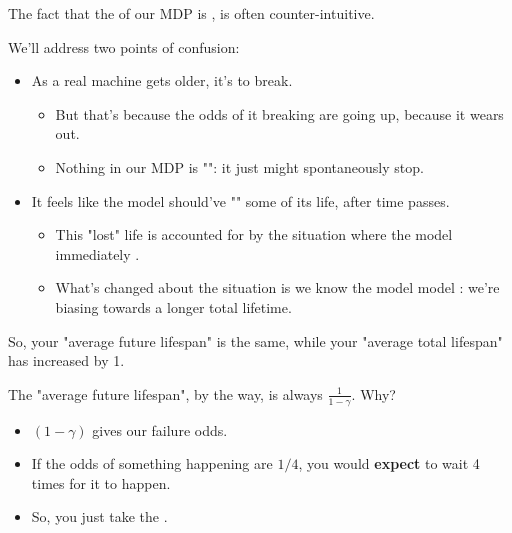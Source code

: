         \begin{clarification}
            The fact that the  of our MDP is , is often counter-intuitive.

            We'll address two points of confusion:

            \begin{itemize}
                \item As a real machine gets older, it's  to break.
                
                \begin{itemize}
                    \item But that's because the odds of it breaking  are going up, because it wears out.
                    \item Nothing in our MDP is "": it just might spontaneously stop.
                \end{itemize}
                    
    
                \item It feels like the model should've "" some of its life, after time passes. 

                    \begin{itemize}
                        \item This "lost" life is accounted for by the situation where the model immediately .
                        \item What's changed about the situation is we know the model model : we're biasing towards a longer total lifetime.
                    \end{itemize}
            \end{itemize}
        \end{clarification}

        So, your "average future lifespan" is the same, while your "average total lifespan" has increased by 1. 

        The "average future lifespan", by the way, is always $\frac{1}{1-\gamma}$. Why?

        \begin{itemize}
            \item $(1-\gamma)$ gives our failure odds.
            \item If the odds of something happening are $1/4$, you would \textbf{expect} to wait 4 times for it to happen.
            \item So, you just take the .\\
        \end{itemize}

